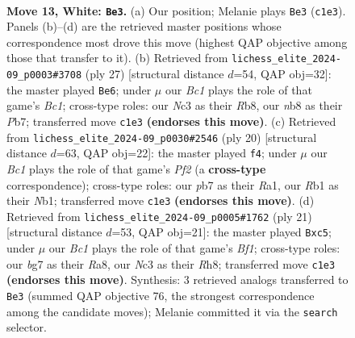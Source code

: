 \documentclass[11pt]{article}
\begin{document}
\begin{figure}[p]
\label{fig:thought-m22}
\end{figure}

\clearpage

\begin{figure}[p]\centering
\begin{subfigure}{0.46\textwidth}\centering
\resizebox{\linewidth}{!}{%
\newchessgame
\chessboard[
  setfen={rn3rk1/pppb2bp/5pp1/4p3/2P1P2N/2N5/PP3PP1/1RBBK2R w K - 2 13},
  showmover=false,
  pgfstyle=straightmove, color=movearrow, markmove={c1-e3}
]}
\caption{}
\end{subfigure}\hfill
\begin{subfigure}{0.46\textwidth}\centering
\resizebox{\linewidth}{!}{%
\newchessgame
\chessboard[
  setfen={1rb1k2r/pp3ppp/2n2n2/1N2p3/4P3/1N3P2/PP1R1KPP/5B1R b k - 0 14},
  showmover=false,
  pgfstyle=straightmove, color=movearrow, markmove={c8-e6}
]}
\caption{}
\end{subfigure}
\\[4pt]
\begin{subfigure}{0.46\textwidth}\centering
\resizebox{\linewidth}{!}{%
\newchessgame
\chessboard[
  setfen={r3kb1r/pp1nn1pp/2p1p3/4Pp2/8/3N4/PPP1KPPP/RNB4R w kq - 1 11},
  showmover=false,
  pgfstyle=straightmove, color=movearrow, markmove={f2-f4}
]}
\caption{}
\end{subfigure}\hfill
\begin{subfigure}{0.46\textwidth}\centering
\resizebox{\linewidth}{!}{%
\newchessgame
\chessboard[
  setfen={r1bk1b1r/pp3ppp/2n5/2P1p3/8/2P1P1B1/P4PPP/R3KBNR b KQ - 0 11},
  showmover=false,
  pgfstyle=straightmove, color=movearrow, markmove={f8-c5}
]}
\caption{}
\end{subfigure}
\caption{\textbf{Move 13, White: \texttt{Be3}.} (a) Our position; Melanie plays \texttt{Be3} (\texttt{c1e3}). Panels (b)--(d) are the retrieved master positions whose correspondence most drove this move (highest QAP objective among those that transfer to it). (b) Retrieved from \texttt{lichess\_elite\_2024-09\_p0003\#3708} (ply 27) [structural distance $d$=54, QAP obj=32]: the master played \texttt{Be6}; under $\mu$ our \emph{Bc1} plays the role of that game's \emph{Bc1}; cross-type roles: our \emph{N}c3 as their \emph{R}b8, our \emph{n}b8 as their \emph{P}b7; transferred move \texttt{c1e3} \textbf{(endorses this move)}. (c) Retrieved from \texttt{lichess\_elite\_2024-09\_p0030\#2546} (ply 20) [structural distance $d$=63, QAP obj=22]: the master played \texttt{f4}; under $\mu$ our \emph{Bc1} plays the role of that game's \emph{Pf2} (a \textbf{cross-type} correspondence); cross-type roles: our \emph{p}b7 as their \emph{R}a1, our \emph{R}b1 as their \emph{N}b1; transferred move \texttt{c1e3} \textbf{(endorses this move)}. (d) Retrieved from \texttt{lichess\_elite\_2024-09\_p0005\#1762} (ply 21) [structural distance $d$=53, QAP obj=21]: the master played \texttt{Bxc5}; under $\mu$ our \emph{Bc1} plays the role of that game's \emph{Bf1}; cross-type roles: our \emph{b}g7 as their \emph{R}a8, our \emph{N}c3 as their \emph{R}h8; transferred move \texttt{c1e3} \textbf{(endorses this move)}. Synthesis: 3 retrieved analogs transferred to \texttt{Be3} (summed QAP objective 76, the strongest correspondence among the candidate moves); Melanie committed it via the \texttt{search} selector.}

\end{figure}
\end{document}
